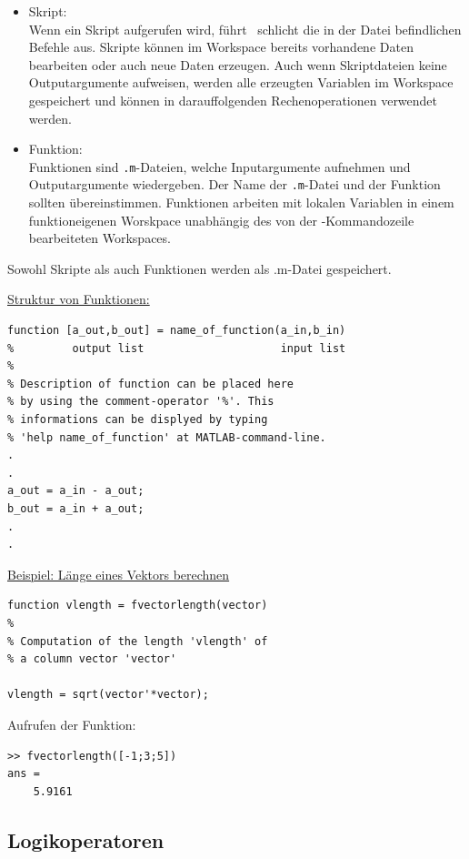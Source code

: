 \begin{itemize}
\item Skript:\\
  Wenn ein Skript aufgerufen wird, führt \matl\ schlicht die in der Datei befindlichen Befehle aus.
  Skripte können im Workspace bereits vorhandene Daten bearbeiten oder auch neue Daten erzeugen.
  Auch wenn Skriptdateien keine Outputargumente aufweisen, werden alle erzeugten Variablen im Workspace gespeichert und können in darauffolgenden Rechenoperationen verwendet werden.
\item Funktion:\\
  Funktionen sind \verb/.m/-Dateien, welche Inputargumente aufnehmen und Outputargumente wiedergeben.
  Der Name der \verb/.m/-Datei und der Funktion sollten übereinstimmen.
  Funktionen arbeiten mit lokalen Variablen in einem funktioneigenen Worskpace unabhängig des von der \matl-Kommandozeile bearbeiteten Workspaces.
\end{itemize}
Sowohl Skripte als auch Funktionen werden als .m-Datei gespeichert.\medskip

\underline{Struktur von Funktionen:}
{\small\begin{verbatim}
function [a_out,b_out] = name_of_function(a_in,b_in)
%         output list                     input list
%
% Description of function can be placed here
% by using the comment-operator '%'. This
% informations can be displyed by typing
% 'help name_of_function' at MATLAB-command-line.
.
.
a_out = a_in - a_out;
b_out = a_in + a_out;
.
.
\end{verbatim}}

\underline{Beispiel: Länge eines Vektors berechnen}
{\small\begin{verbatim}
function vlength = fvectorlength(vector)
%
% Computation of the length 'vlength' of
% a column vector 'vector'

vlength = sqrt(vector'*vector);
\end{verbatim}}
Aufrufen der Funktion:
{\small\begin{verbatim}
>> fvectorlength([-1;3;5])
ans =
    5.9161
\end{verbatim}}



\clearpage %
\subsection*{Logikoperatoren}

